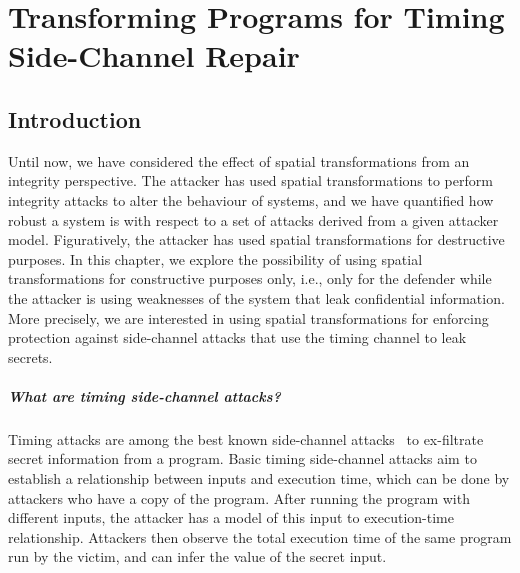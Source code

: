 \chapter{Transforming Programs for Timing Side-Channel Repair}
\label{ch:SideChannelRepair} 
\section{Introduction}
\label{sec:introduction} 
Until now, we have considered the effect of spatial transformations from an integrity perspective. The attacker has used spatial transformations to perform integrity attacks to alter the behaviour of systems, and we have quantified how robust a system is with respect to a set of attacks derived from a given attacker model. 
Figuratively, the attacker has used spatial transformations for destructive purposes. 
In this chapter, we explore the possibility of using spatial transformations for constructive purposes only, i.e., only for the defender while the attacker is using weaknesses of the system that leak confidential information. 
More precisely, we are interested in using spatial transformations for enforcing protection against side-channel attacks that use the timing channel to leak secrets. 


\paragraph*{What are timing side-channel attacks?} Timing attacks are among the best known side-channel attacks~\cite{timing-channel-survey} 
to ex-filtrate secret information from a program. %
Basic timing side-channel attacks aim to establish a relationship between inputs and execution time, which can be done by attackers who have a copy of the program. After running the program with different inputs, the attacker has a model of this input to execution-time relationship. Attackers then observe the total execution time of the same program run by the victim, and can infer the value of the secret input. 


